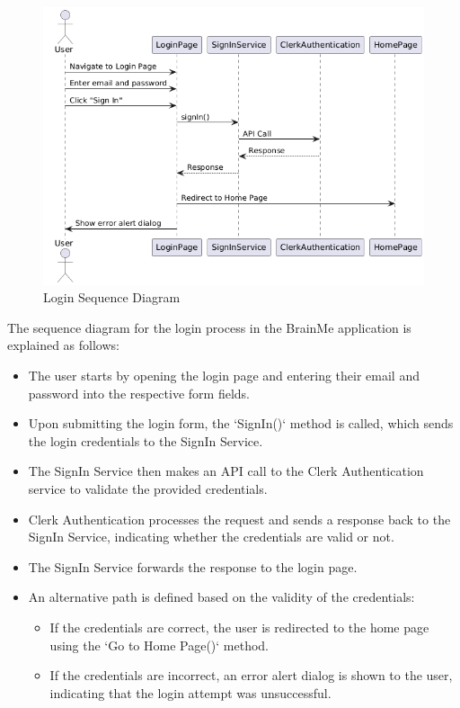 \begin{figure}[H]
    \centering
    \includegraphics[width=1\linewidth, height=0.4\textheight]{Sequence Diagrams/Login.png}
    \caption{Login Sequence Diagram}
\end{figure}

The sequence diagram for the login process in the BrainMe application is explained as follows:

\begin{itemize}
    \item The user starts by opening the login page and entering their email and password into the respective form fields.
    \item Upon submitting the login form, the `SignIn()` method is called, which sends the login credentials to the SignIn Service.
    \item The SignIn Service then makes an API call to the Clerk Authentication service to validate the provided credentials.
    \item Clerk Authentication processes the request and sends a response back to the SignIn Service, indicating whether the credentials are valid or not.
    \item The SignIn Service forwards the response to the login page.
    \item An alternative path is defined based on the validity of the credentials:
    \begin{itemize}
        \item If the credentials are correct, the user is redirected to the home page using the `Go to Home Page()` method.
        \item If the credentials are incorrect, an error alert dialog is shown to the user, indicating that the login attempt was unsuccessful.
    \end{itemize}
\end{itemize}


